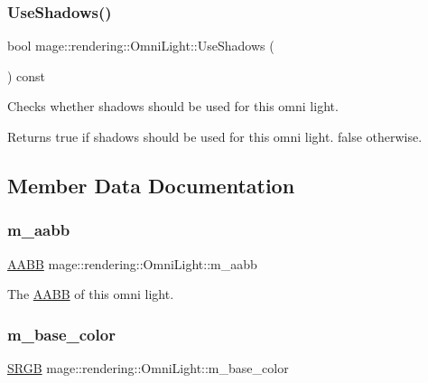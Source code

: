 \subsubsection{\texorpdfstring{Use\+Shadows()}{UseShadows()}}
{\footnotesize\ttfamily bool mage\+::rendering\+::\+Omni\+Light\+::\+Use\+Shadows (\begin{DoxyParamCaption}{ }\end{DoxyParamCaption}) const\hspace{0.3cm}{\ttfamily [noexcept]}}

Checks whether shadows should be used for this omni light.

\begin{DoxyReturn}{Returns}
{\ttfamily true} if shadows should be used for this omni light. {\ttfamily false} otherwise. 
\end{DoxyReturn}


\subsection{Member Data Documentation}
\hypertarget{classmage_1_1rendering_1_1_omni_light_ac2b5bb2e28364445c7bce70c8fa1374e}{}\label{classmage_1_1rendering_1_1_omni_light_ac2b5bb2e28364445c7bce70c8fa1374e} 
\subsubsection{\texorpdfstring{m\+\_\+aabb}{m\_aabb}}
{\footnotesize\ttfamily \hyperlink{classmage_1_1_a_a_b_b}{A\+A\+BB} mage\+::rendering\+::\+Omni\+Light\+::m\+\_\+aabb\hspace{0.3cm}{\ttfamily [private]}}

The \hyperlink{classmage_1_1_a_a_b_b}{A\+A\+BB} of this omni light. \hypertarget{classmage_1_1rendering_1_1_omni_light_a28eb04892aa516cbca86591ebb839b78}{}\label{classmage_1_1rendering_1_1_omni_light_a28eb04892aa516cbca86591ebb839b78} 
\subsubsection{\texorpdfstring{m\+\_\+base\+\_\+color}{m\_base\_color}}
{\footnotesize\ttfamily \hyperlink{structmage_1_1_s_r_g_b}{S\+R\+GB} mage\+::rendering\+::\+Omni\+Light\+::m\+\_\+base\+\_\+color\hspace{0.3cm}{\ttfamily [private]}}

